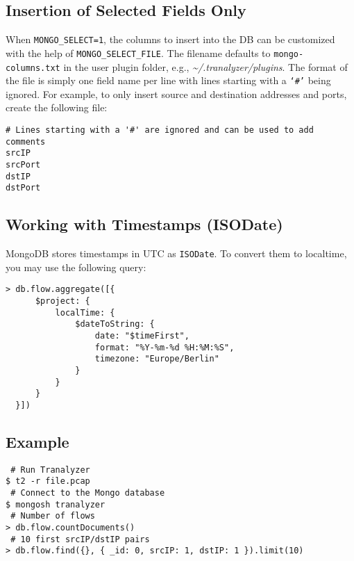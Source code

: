 \documentclass[documentation]{subfiles}
\begin{document}
\subsection{Insertion of Selected Fields Only}\label{mongo:select}
When {\tt MONGO\_SELECT=1}, the columns to insert into the DB can be customized with the help of {\tt MONGO\_SELECT\_FILE}.
The filename defaults to {\tt mongo-columns.txt} in the user plugin folder, e.g., {\em \textasciitilde{}/.tranalyzer/plugins}.
The format of the file is simply one field name per line with lines starting with a {\tt `\#'} being ignored.
For example, to only insert source and destination addresses and ports, create the following file:

\begin{verbatim}
# Lines starting with a '#' are ignored and can be used to add comments
srcIP
srcPort
dstIP
dstPort
\end{verbatim}

\subsection{Working with Timestamps (ISODate)}
MongoDB stores timestamps in UTC as {\tt ISODate}.
To convert them to localtime, you may use the following query:
\begin{verbatim}
> db.flow.aggregate([{
      $project: {
          localTime: {
              $dateToString: {
                  date: "$timeFirst",
                  format: "%Y-%m-%d %H:%M:%S",
                  timezone: "Europe/Berlin"
              }
          }
      }
  }])
\end{verbatim}

\subsection{Example}

{\tt\color{blue} \# Run Tranalyzer}\\
{\tt \$ t2 -r file.pcap}\\

\noindent
{\tt\color{blue} \# Connect to the Mongo database}\\
{\tt \$ mongosh tranalyzer}\\

\noindent
{\tt\color{blue} \# Number of flows}\\
{\tt > db.flow.countDocuments()}\\

\noindent
{\tt\color{blue} \# 10 first srcIP/dstIP pairs}\\
{\tt > db.flow.find(\{\}, \{ \_id: 0, srcIP: 1, dstIP: 1 \}).limit(10)}\\
\end{document}
